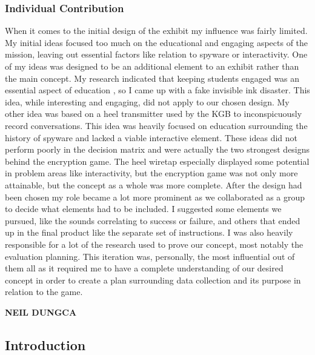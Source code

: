 \documentclass[conference]{IEEEtran}
\begin{document}
\subsubsection{Individual Contribution}

\par When it comes to the initial design of the exhibit my influence was fairly limited. My initial ideas focused too much on the educational and engaging aspects of the mission, leaving out essential factors like relation to spyware or interactivity. One of my ideas was designed to be an additional element to an exhibit rather than the main concept. My research indicated that keeping students engaged was an essential aspect of education \cite{b23}, so I came up with a fake invisible ink disaster. This idea, while interesting and engaging, did not apply to our chosen design. My other idea was based on a heel transmitter used by the KGB to inconspicuously record conversations. This idea was heavily focused on education surrounding the history of spyware \cite{b20} and lacked a viable interactive element. These ideas did not perform poorly in the decision matrix and were actually the two strongest designs behind the encryption game. The heel wiretap especially displayed some potential in problem areas like interactivity, but the encryption game was not only more attainable, but the concept as a whole was more complete. After the design had been chosen my role became a lot more prominent as we collaborated as a group to decide what elements had to be included. I suggested some elements we pursued, like the sounds correlating to success or failure, and others that ended up in the final product like the separate set of instructions. I was also heavily responsible for a lot of the research used to prove our concept, most notably the evaluation planning. This iteration was, personally, the most influential out of them all as it required me to have a complete understanding of our desired concept in order to create a plan surrounding data collection and its purpose in relation to the game. 

\newpage


\vspace{10pt} \LARGE \textbf{NEIL DUNGCA} \normalsize

\subsection{Introduction}
\end{document}
